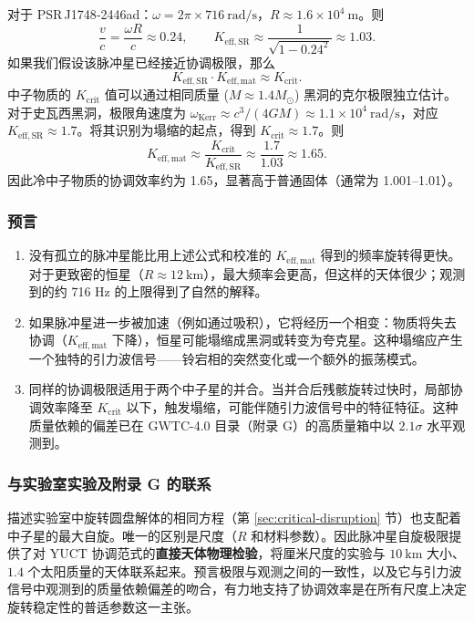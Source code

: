 \documentclass[12pt,a4paper]{article}
\begin{document}
	对于 PSR J1748‑2446ad：\(\omega = 2\pi\times716\ \text{rad/s}\)，\(R\approx 1.6\times10^4\ \text{m}\)。则
	\[
	\frac{v}{c} = \frac{\omega R}{c} \approx 0.24,\qquad
	K_{\mathrm{eff,SR}} \approx \frac{1}{\sqrt{1-0.24^2}} \approx 1.03.
	\]
	如果我们假设该脉冲星已经接近协调极限，那么
	\[
	K_{\mathrm{eff,SR}} \cdot K_{\mathrm{eff,mat}} \approx K_{\mathrm{crit}}.
	\]
	中子物质的 \(K_{\mathrm{crit}}\) 值可以通过相同质量 (\(M\approx1.4M_\odot\)) 黑洞的克尔极限独立估计。对于史瓦西黑洞，极限角速度为 \(\omega_{\text{Kerr}} \approx c^3/(4GM) \approx 1.1\times10^4\ \text{rad/s}\)，对应 \(K_{\mathrm{eff,SR}} \approx 1.7\)。将其识别为塌缩的起点，得到 \(K_{\mathrm{crit}} \approx 1.7\)。则
	\[
	K_{\mathrm{eff,mat}} \approx \frac{K_{\mathrm{crit}}}{K_{\mathrm{eff,SR}}} \approx \frac{1.7}{1.03} \approx 1.65.
	\]
	因此冷中子物质的协调效率约为 1.65，显著高于普通固体（通常为 1.001–1.01）。
	
	\subsubsection{预言}
	
	\begin{enumerate}
		\item 没有孤立的脉冲星能比用上述公式和校准的 \(K_{\mathrm{eff,mat}}\) 得到的频率旋转得更快。对于更致密的恒星（\(R\approx 12\ \text{km}\)），最大频率会更高，但这样的天体很少；观测到的约 716 Hz 的上限得到了自然的解释。
		\item 如果脉冲星进一步被加速（例如通过吸积），它将经历一个相变：物质将失去协调（\(K_{\mathrm{eff,mat}}\) 下降），恒星可能塌缩成黑洞或转变为夸克星。这种塌缩应产生一个独特的引力波信号——铃宕相的突然变化或一个额外的振荡模式。
		\item 同样的协调极限适用于两个中子星的并合。当并合后残骸旋转过快时，局部协调效率降至 \(K_{\mathrm{crit}}\) 以下，触发塌缩，可能伴随引力波信号中的特征特征。这种质量依赖的偏差已在 GWTC-4.0 目录（附录 G）的高质量箱中以 \(2.1\sigma\) 水平观测到。
	\end{enumerate}
	
	\subsubsection{与实验室实验及附录 G 的联系}
	
	描述实验室中旋转圆盘解体的相同方程（第 \ref{sec:critical-disruption} 节）也支配着中子星的最大自旋。唯一的区别是尺度（\(R\) 和材料参数）。因此脉冲星自旋极限提供了对 YUCT 协调范式的\textbf{直接天体物理检验}，将厘米尺度的实验与 \(10\ \text{km}\) 大小、\(1.4\) 个太阳质量的天体联系起来。预言极限与观测之间的一致性，以及它与引力波信号中观测到的质量依赖偏差的吻合，有力地支持了协调效率是在所有尺度上决定旋转稳定性的普适参数这一主张。
	
\end{document}
